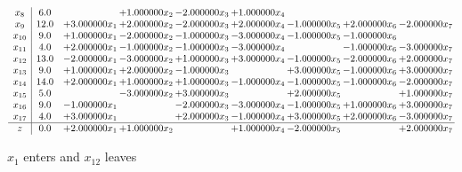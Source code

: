 \documentclass[10pt]{article}
\begin{document}
\[\begin{array}{c| c c@{\hskip 2pt} c@{\hskip 2pt} c@{\hskip 2pt} c@{\hskip 2pt} c@{\hskip 2pt} c@{\hskip 2pt} c@{\hskip 2pt} }
 x_{8}   &  6.0  &   & + 1.000000 x_{2} & -2.000000 x_{3} & + 1.000000 x_{4} &    &    &   \\
 x_{9}   &  12.0 & + 3.000000 x_{1} & + 2.000000 x_{2} & -2.000000 x_{3} & + 2.000000 x_{4} & -1.000000 x_{5} & + 2.000000 x_{6} & -2.000000 x_{7}\\
 x_{10}   &  9.0 & + 1.000000 x_{1} & -2.000000 x_{2} & -1.000000 x_{3} & -3.000000 x_{4} & -1.000000 x_{5} & -1.000000 x_{6} &   \\
 x_{11}   &  4.0 & + 2.000000 x_{1} & -1.000000 x_{2} & -1.000000 x_{3} & -3.000000 x_{4} &   & -1.000000 x_{6} & -3.000000 x_{7}\\
 x_{12}   &  13.0 & -2.000000 x_{1} & -3.000000 x_{2} & + 1.000000 x_{3} & + 3.000000 x_{4} & -1.000000 x_{5} & -2.000000 x_{6} & + 2.000000 x_{7}\\
 x_{13}   &  9.0 & + 1.000000 x_{1} & + 2.000000 x_{2} & -1.000000 x_{3} &   & + 3.000000 x_{5} & -1.000000 x_{6} & + 3.000000 x_{7}\\
 x_{14}   &  14.0 & + 2.000000 x_{1} & + 1.000000 x_{2} & + 1.000000 x_{3} & -1.000000 x_{4} & -1.000000 x_{5} & -1.000000 x_{6} & -2.000000 x_{7}\\
 x_{15}   &  5.0  &   & -3.000000 x_{2} & + 3.000000 x_{3} &   & + 2.000000 x_{5} &   & + 1.000000 x_{7}\\
 x_{16}   &  9.0 & -1.000000 x_{1} &   & -2.000000 x_{3} & -3.000000 x_{4} & -1.000000 x_{5} & + 1.000000 x_{6} & + 3.000000 x_{7}\\
 x_{17}   &  4.0 & + 3.000000 x_{1} &   & + 2.000000 x_{3} & -1.000000 x_{4} & + 3.000000 x_{5} & + 2.000000 x_{6} & -3.000000 x_{7}\\
\hline
z    &  0.0 & + 2.000000 x_{1} & + 1.000000 x_{2} &   & + 1.000000 x_{4} & -2.000000 x_{5} &   & + 2.000000 x_{7}\\
\end{array}\]


 $ x_{1} $ enters and $ x_{12} $ leaves 
\end{document}
